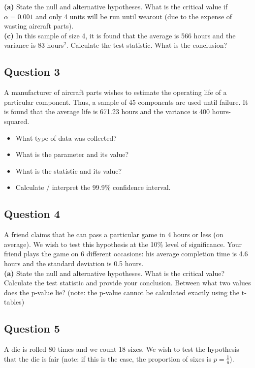 \documentclass[12pt]{article}
\begin{document}
{\bf(a)} State the null and alternative hypotheses.  What is the critical value if $\alpha=0.001$ and only 4 units will be run until wearout (due to the expense of wasting aircraft parts). \quad \\ {\bf(c)} In this sample of size 4, it is found that the average is 566 hours and the variance is 83 hours$^2$. Calculate the test statistic.  What is the conclusion?



	\subsection*{Question 3}
	A manufacturer of aircraft parts wishes to estimate the operating life of a particular component. Thus, a sample of 45 components are used until failure. It is found that the average life is 671.23 hours and the variance is 400 hours-squared.
	\begin{itemize}
		\item[{\bf(a)}] What type of data was collected? \quad \item[{\bf(b)}] What is the parameter and its value? \quad \item[{\bf(c)}] What is the statistic and its value? \quad \item[{\bf(d)}] Calculate / interpret the 99.9\% confidence interval.
	\end{itemize}
	






\subsection*{Question 4}
A friend claims that he can pass a particular game in 4 hours or less (on average). We wish to test this hypothesis at the 10\% level of significance. Your friend plays the game on 6 different occasions: his average completion time is 4.6 hours and the standard deviation is 0.5 hours. \\[-0.2cm]

{\bf(a)} State the null and alternative hypotheses.  What is the critical value?  Calculate the test statistic and provide your conclusion.  Between what two values does the p-value lie? (note: the p-value cannot be calculated exactly using the t-tables)



\subsection*{Question 5}
A die is rolled 80 times and we count 18 sixes. We wish to test the hypothesis that the die is fair (note: if this is the case, the proportion of sixes is $p = \frac{1}{6}$). \\[-0.2cm]
\end{document}
